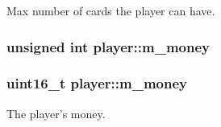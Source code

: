 Max number of cards the player can have. 

\hypertarget{classplayer_a8c0192ef483c0d137886b51fb8d1cc42}{
\subsubsection[{m\-\_\-money}]{\setlength{\rightskip}{0pt plus 5cm}unsigned int player\-::m\-\_\-money\hspace{0.3cm}{\ttfamily [private]}}}\label{classplayer_a8c0192ef483c0d137886b51fb8d1cc42}
\hypertarget{classplayer_a4581e0079269f9b01515df03c2619e53}{
\subsubsection[{m\-\_\-money}]{\setlength{\rightskip}{0pt plus 5cm}uint16\-\_\-t player\-::m\-\_\-money\hspace{0.3cm}{\ttfamily [private]}}}\label{classplayer_a4581e0079269f9b01515df03c2619e53}


The player's money. 

